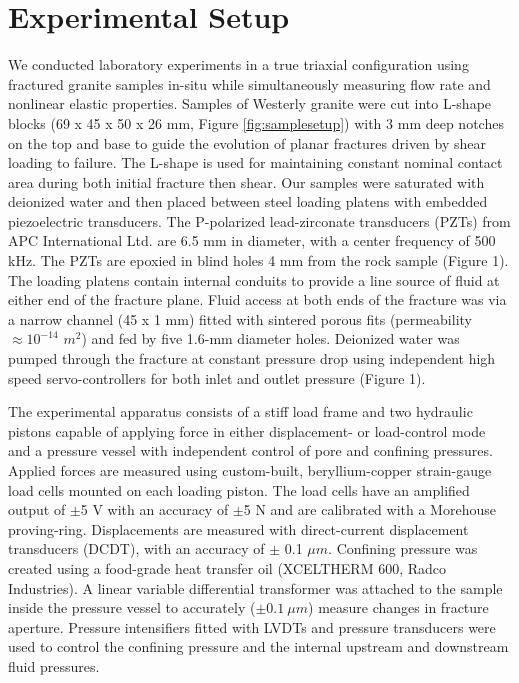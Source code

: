 \documentclass[draft]{agujournal2019}
\begin{document}
\section{Experimental Setup}
\label{sec:experimnt_setup}

We conducted laboratory experiments in a true triaxial configuration using fractured granite samples in-situ while simultaneously measuring flow rate and nonlinear elastic properties. Samples of Westerly granite were cut  into L-shape blocks (69 x 45 x 50 x 26 mm, Figure \ref{fig:samplesetup}) with 3 mm deep notches on the top and base to guide the evolution of planar fractures driven by shear loading to failure. The L-shape is used for maintaining constant nominal contact area during both initial fracture then shear. Our samples were saturated with deionized water and then placed between steel loading platens  with  embedded piezoelectric transducers. The P-polarized lead-zirconate transducers (PZTs) from APC International Ltd. are 6.5 mm in diameter, with a center frequency of 500 kHz. The PZTs are epoxied in blind holes 4 mm from the rock sample (Figure 1). The loading platens contain internal conduits to provide a line source of fluid at either end of the fracture plane. Fluid access at both ends of the fracture was via a narrow channel (45 x 1 mm) fitted with sintered porous fits (permeability $\approx 10^{-14}$ $m^2$) and fed by five 1.6-mm diameter holes.  Deionized water was pumped through the fracture at constant pressure drop using independent high speed servo-controllers for both inlet and outlet pressure (Figure 1).

The experimental apparatus consists of a stiff load frame and two hydraulic pistons capable of applying force in either displacement- or load-control mode and a pressure vessel with independent control of pore and confining pressures. Applied forces are measured using custom-built, beryllium-copper strain-gauge load cells mounted on each loading piston. The load cells have an amplified output of $ \pm $5 V with an accuracy of $ \pm $5 N and are calibrated with a Morehouse proving-ring. Displacements are measured with direct-current displacement transducers (DCDT), with an accuracy of $\pm$ 0.1 $\mu m$. Confining pressure was created using a food-grade heat transfer oil (XCELTHERM 600, Radco Industries). A linear variable differential transformer was attached to the sample inside the pressure vessel to accurately ($\pm 0.1\ \mu m$) measure changes in fracture aperture. Pressure intensifiers fitted with LVDTs and pressure transducers were used to control the confining pressure and the internal upstream and downstream fluid pressures.
\end{document}
